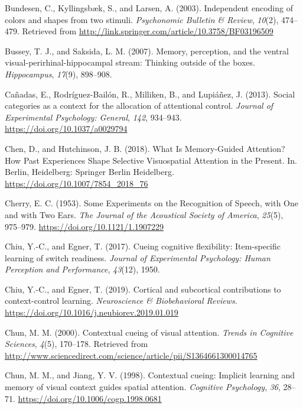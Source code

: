 \documentclass[]{DissertateCUNY}
\begin{document}
\leavevmode\hypertarget{ref-bundesen_independent_2003}{}%
Bundesen, C., Kyllingsbæk, S., and Larsen, A. (2003). Independent
encoding of colors and shapes from two stimuli. \emph{Psychonomic
Bulletin \& Review}, \emph{10}(2), 474--479. Retrieved from
\url{http://link.springer.com/article/10.3758/BF03196509}

\leavevmode\hypertarget{ref-bussey_memory_2007}{}%
Bussey, T. J., and Saksida, L. M. (2007). Memory, perception, and the
ventral visual-perirhinal-hippocampal stream: Thinking outside of the
boxes. \emph{Hippocampus}, \emph{17}(9), 898--908.

\leavevmode\hypertarget{ref-canadas_social_2013}{}%
Cañadas, E., Rodríguez-Bailón, R., Milliken, B., and Lupiáñez, J.
(2013). Social categories as a context for the allocation of attentional
control. \emph{Journal of Experimental Psychology: General}, \emph{142},
934--943. \url{https://doi.org/10.1037/a0029794}

\leavevmode\hypertarget{ref-chen_what_2018}{}%
Chen, D., and Hutchinson, J. B. (2018). What Is Memory-Guided Attention?
How Past Experiences Shape Selective Visuospatial Attention in the
Present. In. Berlin, Heidelberg: Springer Berlin Heidelberg.
\url{https://doi.org/10.1007/7854_2018_76}

\leavevmode\hypertarget{ref-cherry_experiments_1953}{}%
Cherry, E. C. (1953). Some Experiments on the Recognition of Speech,
with One and with Two Ears. \emph{The Journal of the Acoustical Society
of America}, \emph{25}(5), 975--979.
\url{https://doi.org/10.1121/1.1907229}

\leavevmode\hypertarget{ref-chiu_cueing_2017}{}%
Chiu, Y.-C., and Egner, T. (2017). Cueing cognitive flexibility:
Item-specific learning of switch readiness. \emph{Journal of
Experimental Psychology: Human Perception and Performance},
\emph{43}(12), 1950.

\leavevmode\hypertarget{ref-chiu_cortical_2019}{}%
Chiu, Y.-C., and Egner, T. (2019). Cortical and subcortical
contributions to context-control learning. \emph{Neuroscience \&
Biobehavioral Reviews}.
\url{https://doi.org/10.1016/j.neubiorev.2019.01.019}

\leavevmode\hypertarget{ref-chun_contextual_2000}{}%
Chun, M. M. (2000). Contextual cueing of visual attention. \emph{Trends
in Cognitive Sciences}, \emph{4}(5), 170--178. Retrieved from
\url{http://www.sciencedirect.com/science/article/pii/S1364661300014765}

\leavevmode\hypertarget{ref-chun_contextual_1998}{}%
Chun, M. M., and Jiang, Y. V. (1998). Contextual cueing: Implicit
learning and memory of visual context guides spatial attention.
\emph{Cognitive Psychology}, \emph{36}, 28--71.
\url{https://doi.org/10.1006/cogp.1998.0681}
\end{document}
